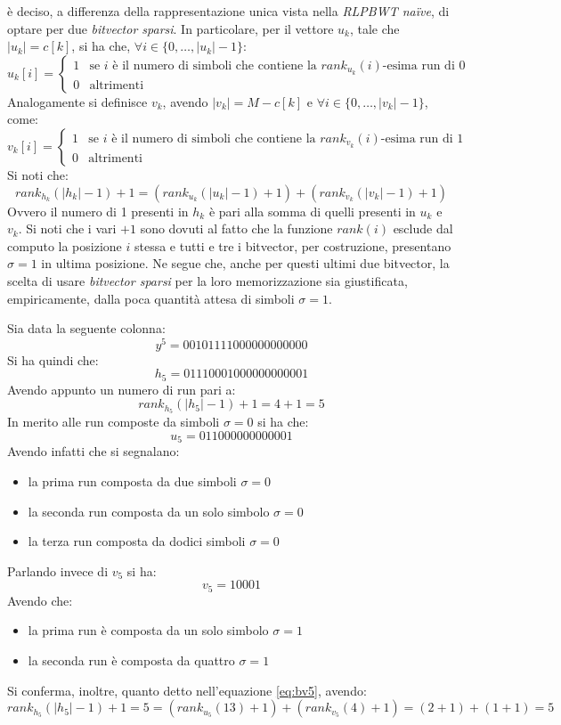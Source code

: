 è deciso, a differenza della rappresentazione unica vista nella \textit{RLPBWT
  na\"{i}ve}, di optare per due \textit{bitvector sparsi}. In particolare, per il
vettore $u_k$, tale che $|u_k|=c[k]$, si ha che, $\forall
i\in\{0,\ldots,|u_k|-1\}$: 
\begin{equation}
  \label{eq:bv3}
  u_k[i]=
  \begin{cases}
    1&\mbox{se }i \mbox{ è il numero di simboli che contiene la
    }rank_{u_k}(i)\mbox{-esima run di 0}\\
    0&\mbox{altrimenti}
  \end{cases}
\end{equation}
Analogamente si definisce $v_k$, avendo $|v_k|=M-c[k]$ e $\forall
i\in\{0,\ldots,|v_k|-1\}$, come: 
\begin{equation}
  \label{eq:bv4}
  v_k[i]=
  \begin{cases}
    1&\mbox{se }i \mbox{ è il numero di simboli che contiene la
    }rank_{v_k}(i)\mbox{-esima run di 1}\\
    0&\mbox{altrimenti}
  \end{cases}
\end{equation}
Si noti che:
\begin{equation}
  \label{eq:bv5}
  rank_{h_k}(|h_k|-1)+1=(rank_{u_k}(|u_k|-1)+1)+(rank_{v_k}(|v_k|-1)+1)
\end{equation}
Ovvero il numero di 1 presenti in $h_k$ è pari alla somma di quelli presenti in
$u_k$ e $v_k$. Si noti che i vari $+1$ sono dovuti al fatto che la funzione
$rank(i)$ esclude dal computo la posizione $i$ stessa e tutti e tre i bitvector,
per costruzione, presentano $\sigma=1$ in ultima posizione. Ne segue che, anche
per questi ultimi due bitvector, la scelta di 
usare \textit{bitvector sparsi} per la loro memorizzazione sia giustificata,
empiricamente, dalla poca quantità attesa di simboli $\sigma=1$.
\begin{esempio}
  \label{es:bv1}
  Sia data la seguente colonna:
  \[y^5=00101111000000000000\]
  Si ha quindi che:
  \[h_5=01110001000000000001\]
  Avendo appunto un numero di run pari a:
  \[rank_{h_5}(|h_5|-1)+1=4+1=5\]
  In merito alle run composte da simboli $\sigma=0$ si ha che:
  \[u_5=011000000000001\]
  Avendo infatti che si segnalano:
  \begin{itemize}
    \item la prima run composta da due simboli $\sigma=0$
    \item la seconda run composta da un solo simbolo $\sigma=0$
    \item la terza run composta da dodici simboli $\sigma=0$
  \end{itemize}
  Parlando invece di $v_5$ si ha:
  \[v_5=10001\]
  Avendo che:
  \begin{itemize}
    \item la prima run è composta da un solo simbolo $\sigma=1$
    \item la seconda run è composta da quattro $\sigma=1$
  \end{itemize}
  Si conferma, inoltre, quanto detto nell'equazione \ref{eq:bv5}, avendo:
  \[rank_{h_5}(|h_5|-1)+1=5 = (rank_{u_5}(13)+1)+(rank_{v_5}(4)+1)=(2+1)+(1+1)=5\]
\end{esempio}
